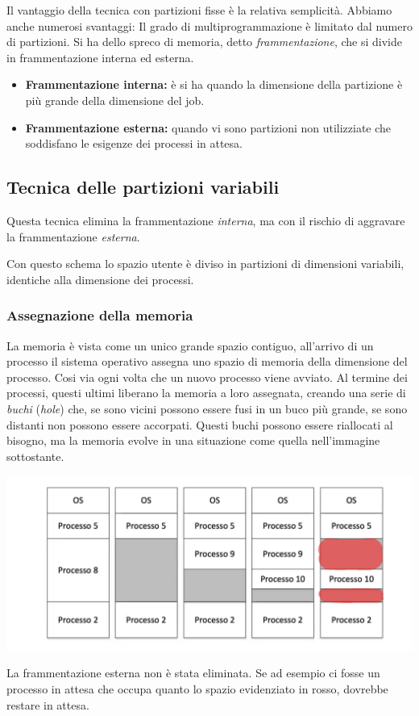 \documentclass[a4paper,12pt, twoside]{report}
\begin{document}
Il vantaggio della tecnica con partizioni fisse \`e la relativa semplicit\`a. Abbiamo anche 
numerosi svantaggi:
Il grado di multiprogrammazione \`e limitato dal numero di partizioni. Si ha dello spreco di 
memoria, detto \emph{frammentazione}, che si divide in frammentazione interna ed esterna.
\begin{itemize}
    \item \textbf{Frammentazione interna:} \`e si ha quando la dimensione della partizione \`e pi\`u grande della dimensione del job. 
    \item \textbf{Frammentazione esterna:} quando vi sono partizioni non utilizziate che 
        soddisfano le esigenze dei processi in attesa.
\end{itemize}

\subsection{Tecnica delle partizioni variabili}

Questa tecnica elimina la frammentazione \emph{interna}, ma con il rischio di aggravare la 
frammentazione \emph{esterna}.

Con questo schema lo spazio utente \`e diviso in partizioni di dimensioni variabili, identiche
alla dimensione dei processi. 

\subsubsection{Assegnazione della memoria}

La memoria \`e vista come un unico grande spazio contiguo, all'arrivo di un processo il 
sistema operativo assegna uno spazio di memoria della dimensione del processo. Cosi via 
ogni volta che un nuovo processo viene avviato. Al termine dei processi, questi ultimi 
liberano la memoria a loro assegnata, creando una serie di \emph{buchi} (\emph{hole}) che, 
se sono vicini possono essere fusi in un buco pi\`u grande, se sono distanti non possono 
essere accorpati. Questi buchi possono essere riallocati al bisogno, ma la memoria evolve
in una situazione come quella nell'immagine sottostante. 
\begin{center}
    \includegraphics[scale=0.2]{varHoleEx}
\end{center} 
La frammentazione esterna non \`e stata eliminata. Se ad esempio ci fosse un processo in 
attesa che occupa quanto lo spazio evidenziato in rosso, dovrebbe restare in attesa.
\end{document}
